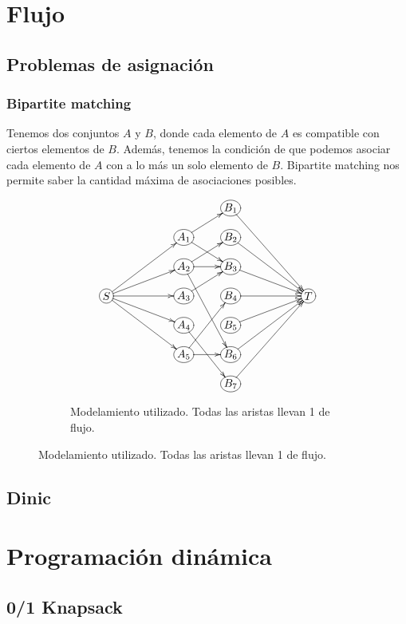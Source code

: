 \documentclass[oneside]{book}
\begin{document}
	\chapter{Flujo}
	\section{Problemas de asignaci\'on}
	\subsection{Bipartite matching}
	Tenemos dos conjuntos $A$ y $B$, donde cada elemento de $A$ es compatible con ciertos elementos de $B$. Adem\'as, tenemos la condici\'on de que podemos asociar cada elemento de $A$ con a lo m\'as un solo elemento de $B$. Bipartite matching nos permite saber la cantidad m\'axima de asociaciones posibles.
\begin{figure}[h]
\centering
\begin{subfigure}{.5\textwidth}
\begin{displaymath}
\xymatrix@R-1pc{
&&&*+[o][F-]{B_1} \ar[dddrr] \\
&&*+[o][F-]{A_1} \ar[ur] \ar[dr]
&*+[o][F-]{B_2} \ar[ddrr] \\
&&*+[o][F-]{A_2} \ar[r] \ar[dddr] \ar[ur]
&*+[o][F-]{B_3} \ar[drr] \\
*+[o][F-]{S} \ar[rruu] \ar[rru] \ar[rr] \ar[rrd] \ar[rrdd]
&&*+[o][F-]{A_3} \ar[ur]
&*+[o][F-]{B_4} \ar[rr]
&&*+[o][F-]{T} \\
&&*+[o][F-]{A_4} \ar[ddr]
&*+[o][F-]{B_5} \ar[urr] \\
&&*+[o][F-]{A_5} \ar[r] \ar[uur]
&*+[o][F-]{B_6} \ar[uurr] \\
&&&*+[o][F-]{B_7} \ar[uuurr]
}
\end{displaymath}
\caption*{Modelamiento utilizado. Todas las aristas llevan 1 de flujo.}
\end{subfigure}

\end{figure}

\section{Dinic}
	
	\chapter{Programaci\'on din\'amica}
	\section{0/1 Knapsack}
	
\end{document}
